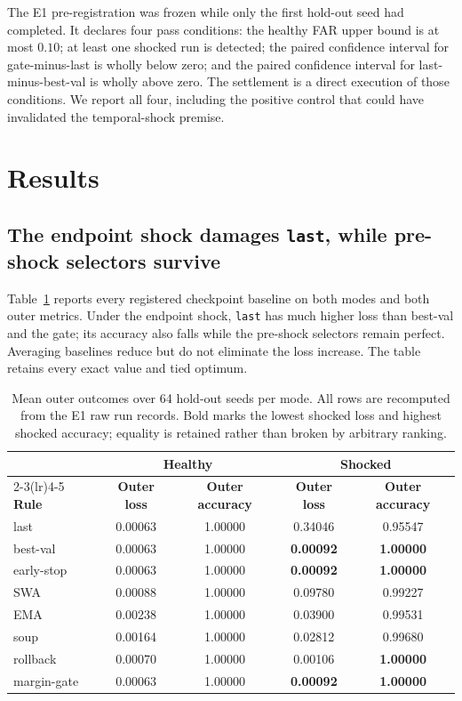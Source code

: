 \documentclass{article} %
\theoremstyle{remark}
\begin{document}
The E1 pre-registration was frozen while only the first hold-out seed had completed. It declares
four pass conditions: the healthy FAR upper bound is at most $0.10$; at least one shocked run is
detected; the paired confidence interval for gate-minus-last is wholly below zero; and the paired
confidence interval for last-minus-best-val is wholly above zero. The settlement is a direct
execution of those conditions. We report all four, including the positive control that could have
invalidated the temporal-shock premise.

\section{Results}
\label{sec:results}

\subsection{The endpoint shock damages \texttt{last}, while pre-shock selectors survive}
\label{sec:rule-results}

Table~\ref{tab:arms} reports every registered checkpoint baseline on both modes and both outer
metrics. Under the endpoint shock, \texttt{last} has much higher loss than best-val and the gate;
its accuracy also falls while the pre-shock selectors remain perfect. Averaging baselines reduce
but do not eliminate the loss increase. The table retains every exact value and tied optimum.

\begin{table}[t]
\centering
\caption{Mean outer outcomes over 64 hold-out seeds per mode. All rows are recomputed from the E1
raw run records. Bold marks the lowest shocked loss and highest shocked accuracy; equality is
retained rather than broken by arbitrary ranking.}
\label{tab:arms}
\small
\begin{tabular}{lcccc}
\toprule
& \multicolumn{2}{c}{\textbf{Healthy}} & \multicolumn{2}{c}{\textbf{Shocked}} \\
\cmidrule(lr){2-3}\cmidrule(lr){4-5}
\textbf{Rule} & \textbf{Outer loss} & \textbf{Outer accuracy} & \textbf{Outer loss} & \textbf{Outer accuracy} \\
\midrule
last        & 0.00063 & 1.00000 & 0.34046 & 0.95547 \\
best-val    & 0.00063 & 1.00000 & \textbf{0.00092} & \textbf{1.00000} \\
early-stop  & 0.00063 & 1.00000 & \textbf{0.00092} & \textbf{1.00000} \\
SWA         & 0.00088 & 1.00000 & 0.09780 & 0.99227 \\
EMA         & 0.00238 & 1.00000 & 0.03900 & 0.99531 \\
soup        & 0.00164 & 1.00000 & 0.02812 & 0.99680 \\
rollback    & 0.00070 & 1.00000 & 0.00106 & \textbf{1.00000} \\
margin-gate & 0.00063 & 1.00000 & \textbf{0.00092} & \textbf{1.00000} \\
\bottomrule
\end{tabular}
\end{table}
\end{document}
